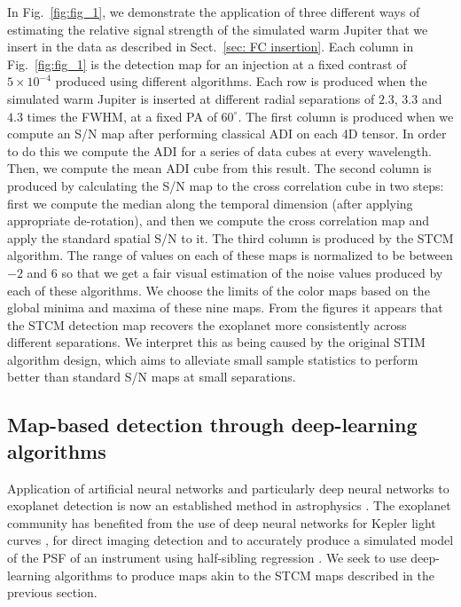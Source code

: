 \documentclass{aa}
\begin{document}
In Fig.~\ref{fig:fig_1}, we demonstrate the application of three different ways of estimating the relative signal strength of the simulated warm Jupiter that we insert in the data as described in Sect.~\ref{sec: FC insertion}.
Each column in Fig.~\ref{fig:fig_1} is the detection map for an injection at a fixed contrast of $5\times 10^{-4}$ produced using different algorithms. %
Each row is produced when the simulated warm Jupiter is inserted at different radial separations of $2.3$, $3.3$ and $4.3$ times the FWHM, at a fixed PA of $60^{\circ}$.
The first column is produced when we compute an S/N map \citep[as defined in][]{2014Mawet} after performing classical ADI on each 4D tensor.
In order to do this we compute the ADI for a series of data cubes at every wavelength. Then, we compute the mean ADI cube from this result. 
The second column is produced by calculating the S/N map \citep[as defined in][]{2014Mawet} to the cross correlation cube in two steps: first we compute the median along the temporal dimension (after applying appropriate de-rotation), and then we compute the cross correlation map and apply the standard spatial S/N to it.
The third column is produced by the STCM algorithm.
The range of values on each of these maps is normalized to be between $-2$ and $6$ so that we get a fair visual estimation of the noise values produced by each of these algorithms.
We choose the limits of the color maps based on the global minima and maxima of these nine maps.
From the figures it appears that the STCM detection map recovers the exoplanet more consistently across different separations. We interpret this as being caused by the original STIM algorithm design, which aims to alleviate small sample statistics to perform better than standard S/N maps at small separations.

\subsection{Map-based detection through deep-learning algorithms}\label{sec:ML algorithms}

Application of artificial neural networks and particularly deep neural networks to exoplanet detection is now an established method in astrophysics \citep[][]{2020Fluke}.
The exoplanet community has benefited from the use of deep neural networks for Kepler light curves \cite{2018Pearson}, for direct imaging detection \cite{2018Gomez} and to accurately produce a simulated model of the PSF of an instrument using half-sibling regression \citep{2022Gebhard}.
We seek to use deep-learning algorithms to produce maps akin to the STCM maps described in the previous section.
\end{document}
